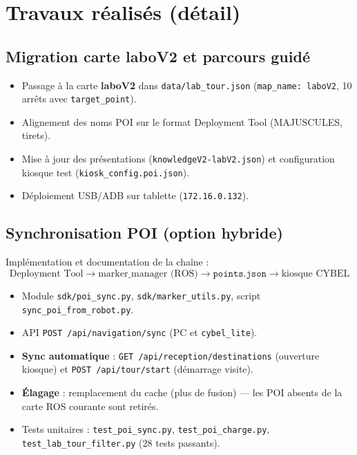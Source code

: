\documentclass[11pt,a4paper]{article}
\begin{document}
\section{Travaux réalisés (détail)}

\subsection{Migration carte laboV2 et parcours guidé}

\begin{itemize}[noitemsep]
  \item Passage à la carte \textbf{laboV2} dans \texttt{data/lab\_tour.json} (\texttt{map\_name: laboV2}, 10 arrêts avec \texttt{target\_point}).
  \item Alignement des noms POI sur le format Deployment Tool (MAJUSCULES, tirets).
  \item Mise à jour des présentations (\texttt{knowledgeV2-labV2.json}) et configuration kiosque test (\texttt{kiosk\_config.poi.json}).
  \item Déploiement USB/ADB sur tablette (\texttt{172.16.0.132}).
\end{itemize}

\subsection{Synchronisation POI (option hybride)}

Implémentation et documentation de la chaîne :
\[
\text{Deployment Tool} \rightarrow \text{marker\_manager (ROS)} \rightarrow \texttt{points.json} \rightarrow \text{kiosque CYBEL}
\]

\begin{itemize}[noitemsep]
  \item Module \texttt{sdk/poi\_sync.py}, \texttt{sdk/marker\_utils.py}, script \texttt{sync\_poi\_from\_robot.py}.
  \item API \texttt{POST /api/navigation/sync} (PC et \texttt{cybel\_lite}).
  \item \textbf{Sync automatique} : \texttt{GET /api/reception/destinations} (ouverture kiosque) et \texttt{POST /api/tour/start} (démarrage visite).
  \item \textbf{Élagage} : remplacement du cache (plus de fusion) — les POI absents de la carte ROS courante sont retirés.
  \item Tests unitaires : \texttt{test\_poi\_sync.py}, \texttt{test\_poi\_charge.py}, \texttt{test\_lab\_tour\_filter.py} (28 tests passants).
\end{itemize}
\end{document}
